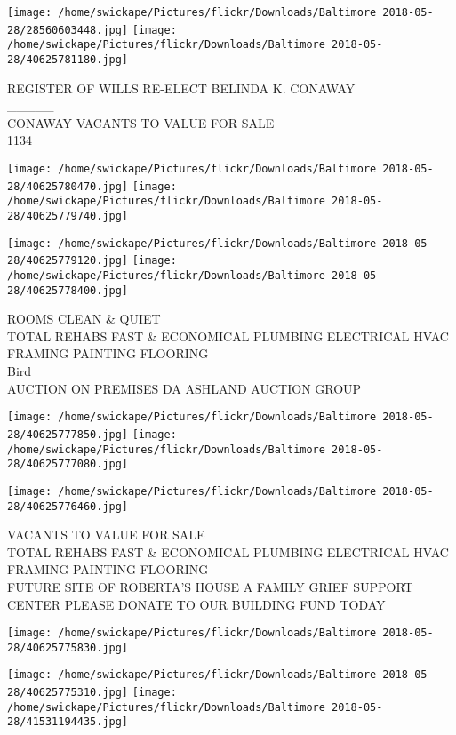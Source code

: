 \documentclass[10pt,letterpaper]{article}
\begin{document}
\texttt{[image: /home/swickape/Pictures/flickr/Downloads/Baltimore 2018-05-28/28560603448.jpg]}
\texttt{[image: /home/swickape/Pictures/flickr/Downloads/Baltimore 2018-05-28/40625781180.jpg]}

REGISTER OF WILLS RE{-}ELECT BELINDA K. CONAWAY\\
\_\_\_\_\_\\
CONAWAY VACANTS TO VALUE FOR SALE\\
1134\\
\pagebreak

\texttt{[image: /home/swickape/Pictures/flickr/Downloads/Baltimore 2018-05-28/40625780470.jpg]}
\texttt{[image: /home/swickape/Pictures/flickr/Downloads/Baltimore 2018-05-28/40625779740.jpg]}

\texttt{[image: /home/swickape/Pictures/flickr/Downloads/Baltimore 2018-05-28/40625779120.jpg]}
\texttt{[image: /home/swickape/Pictures/flickr/Downloads/Baltimore 2018-05-28/40625778400.jpg]}

ROOMS CLEAN \& QUIET\\
TOTAL REHABS FAST \& ECONOMICAL PLUMBING ELECTRICAL HVAC FRAMING PAINTING FLOORING\\
Bird\\
AUCTION ON PREMISES DA ASHLAND AUCTION GROUP\\
\pagebreak

\texttt{[image: /home/swickape/Pictures/flickr/Downloads/Baltimore 2018-05-28/40625777850.jpg]}
\texttt{[image: /home/swickape/Pictures/flickr/Downloads/Baltimore 2018-05-28/40625777080.jpg]}

\texttt{[image: /home/swickape/Pictures/flickr/Downloads/Baltimore 2018-05-28/40625776460.jpg]}

VACANTS TO VALUE FOR SALE\\
TOTAL REHABS FAST \& ECONOMICAL PLUMBING ELECTRICAL HVAC FRAMING PAINTING FLOORING\\
FUTURE SITE OF ROBERTA'S HOUSE A FAMILY GRIEF SUPPORT CENTER PLEASE DONATE TO OUR BUILDING FUND TODAY\\
\pagebreak

\texttt{[image: /home/swickape/Pictures/flickr/Downloads/Baltimore 2018-05-28/40625775830.jpg]}

\vspace{0.25in}
\texttt{[image: /home/swickape/Pictures/flickr/Downloads/Baltimore 2018-05-28/40625775310.jpg]}
\texttt{[image: /home/swickape/Pictures/flickr/Downloads/Baltimore 2018-05-28/41531194435.jpg]}
\end{document}
